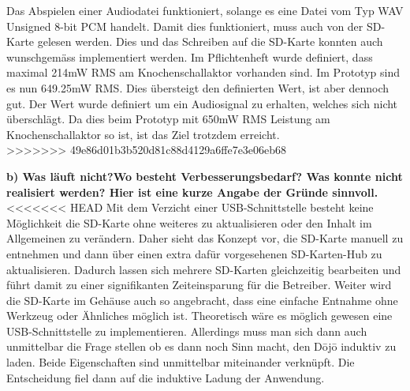 Das Abspielen einer Audiodatei funktioniert, solange es eine Datei vom Typ WAV Unsigned 8-bit PCM handelt. Damit dies funktioniert, muss auch von der SD-Karte gelesen werden. Dies und das Schreiben auf die SD-Karte konnten auch wunschgemäss implementiert werden. Im Pflichtenheft wurde definiert, dass maximal 214mW RMS am Knochenschallaktor vorhanden sind. Im Prototyp sind es nun 649.25mW RMS. Dies übersteigt den definierten Wert, ist aber dennoch gut. Der Wert wurde definiert um ein Audiosignal zu erhalten, welches sich nicht überschlägt. Da dies beim Prototyp mit 650mW RMS Leistung am Knochenschallaktor so ist, ist das Ziel trotzdem erreicht. \\
>>>>>>> 49e86d01b3b520d81c88d4129a6ffe7e3e06eb68
 
\textbf{b) Was läuft nicht?Wo besteht Verbesserungsbedarf? Was konnte nicht realisiert werden? Hier ist eine kurze Angabe der Gründe sinnvoll.}
<<<<<<< HEAD
Mit dem Verzicht einer USB-Schnittstelle besteht keine Möglichkeit die SD-Karte ohne weiteres zu aktualisieren oder den Inhalt im Allgemeinen zu verändern. Daher sieht das Konzept vor, die SD-Karte manuell zu entnehmen und dann über einen extra dafür vorgesehenen SD-Karten-Hub zu aktualisieren. Dadurch lassen sich mehrere SD-Karten gleichzeitig bearbeiten und führt damit zu einer signifikanten Zeiteinsparung für die Betreiber. Weiter wird die SD-Karte im Gehäuse auch so angebracht, dass eine einfache Entnahme ohne Werkzeug oder Ähnliches möglich ist. Theoretisch wäre es möglich gewesen eine USB-Schnittstelle zu implementieren. Allerdings muss man sich dann auch unmittelbar die Frage stellen ob es dann noch Sinn macht, den Dōjō induktiv zu laden. Beide Eigenschaften sind unmittelbar miteinander verknüpft. Die Entscheidung fiel dann auf die induktive Ladung der Anwendung.
 
